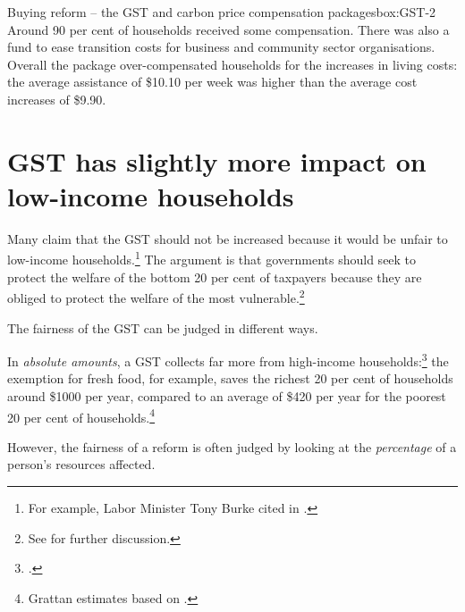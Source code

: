 \documentclass{grattanAlpha}
\begin{document}
\begin{bigboxC*}{Buying reform -- the GST and carbon price compensation packages}{box:GST-2}
Around 90 per cent of households received some compensation. There was also a fund to ease transition costs for business and community sector organisations. Overall the package over-compensated households for the increases in living costs: the average assistance of \$10.10 per week was higher than the average cost increases of \$9.90. 


\end{bigboxC*}

\section{GST has slightly more impact on low-income households}\label{sec:GST-3-1}
Many claim that the GST should not be increased because it would be unfair to low-income households.\footnote{For example, Labor Minister Tony Burke cited in \textcite{Hutchens2015-ALP-not-support-GST}.}  The argument is that governments should seek to protect the welfare of the bottom 20 per cent of taxpayers because they are obliged to protect the welfare of the most vulnerable.\footnote{See \textcite[][21]{Daley2013} for further discussion.}

The fairness of the GST can be judged in different ways. 

In \emph{absolute amounts}, a GST collects far more from high-income households:\footcites{OECDKoreaInstitutePublicFinance2014-Distributional-Effects-Consumption-Taxes}{Freebairn2013}{HenryTaxReview2010}
the exemption for fresh food, for example, saves the richest 20 per cent of households around \$1000 per year, compared to an average of \$420 per year for the poorest 20 per cent of households.\footnote{Grattan estimates based on \textcites{Treasury2015TES2014}{ABS2011HES0910curf}.}

However, the fairness of a reform is often judged by looking at the \emph{percentage} of a person’s resources affected.  
\end{document}
